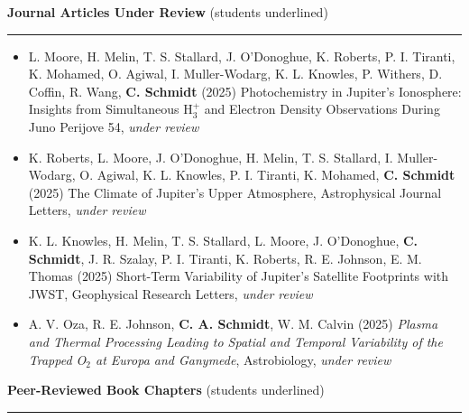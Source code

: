\documentclass[12pt]{report}
\begin{document}
\vspace{2 mm}
\noindent\textbf{Journal Articles Under Review} (students underlined) \rm\hspace*{\fill} \\
\rule{\textwidth}{1pt}
\begin{itemize} \itemsep -2pt %

  \item L. Moore, H. Melin, T. S. Stallard, J. O’Donoghue, K. Roberts, P. I. Tiranti, K. Mohamed, O. Agiwal, I. Muller-Wodarg, K. L. Knowles, P. Withers, D. Coffin, R. Wang, \textbf{C. Schmidt} (2025) Photochemistry in Jupiter's Ionosphere: Insights from Simultaneous H$_3^+$ and Electron Density Observations During Juno Perijove 54, \textit{under review} 
  \item K. Roberts, L. Moore, J. O’Donoghue, H. Melin, T. S. Stallard, I. Muller-Wodarg, O. Agiwal, K. L. Knowles, P. I. Tiranti, K. Mohamed, \textbf{C. Schmidt} (2025) The Climate of Jupiter's Upper Atmosphere, Astrophysical Journal Letters, \textit{under review} 
  \item K. L. Knowles, H. Melin, T. S. Stallard, L. Moore, J. O’Donoghue, \textbf{C. Schmidt}, J. R. Szalay, P. I. Tiranti, K. Roberts, R. E. Johnson, E. M. Thomas (2025) Short-Term Variability of Jupiter’s Satellite Footprints with JWST, Geophysical Research Letters, \textit{under review}
  \item A. V. Oza, R. E. Johnson, \textbf{C. A. Schmidt}, W. M. Calvin (2025) \textit{Plasma and Thermal Processing Leading to Spatial and Temporal Variability of the Trapped O$_2$ at Europa and Ganymede}, Astrobiology, \textit{under review}
 \end{itemize}
\vspace{2 mm}
\noindent\textbf{Peer-Reviewed Book Chapters} (students underlined) \rm\hspace*{\fill} \\
\rule{\textwidth}{1pt}
\end{document}

